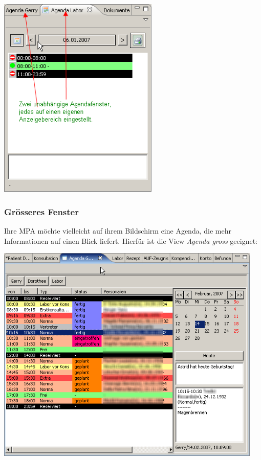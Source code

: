 \includegraphics[width=3in]{images/agendamulti.png}

\subsubsection{Grösseres Fenster}

Ihre MPA möchte vielleicht auf ihrem Bildschirm eine Agenda, die mehr Informationen auf einen Blick liefert. Hierfür ist die View \textit{Agenda gross} geeignet:

\includegraphics[width=5in]{images/agenda2.png}

